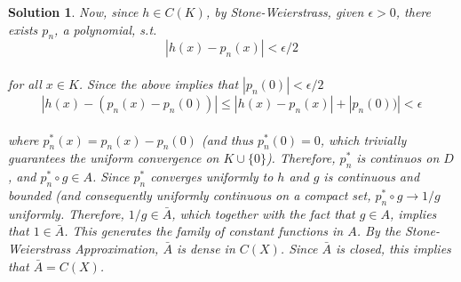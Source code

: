 \documentclass{article} %
\theoremstyle{quest}
\newtheorem*{solution}{Solution}
\begin{document}
\begin{solution}
Now, since $h\in C(K)$, by Stone-Weierstrass, given  $\epsilon >0$, there exists $p_{n}$, a polynomial, s.t.\\

$$|h(x)-p_{n}(x)|<\epsilon /2 $$\\

for all $x \in K$. Since the above implies that $|p_n(0)|< \epsilon/2$  \\
 
$$|h(x)-(p_{n}(x)-p_n(0))|\leq |h(x)-p_{n}(x)|+|p_n(0))|<\epsilon $$\\

where $p^*_n(x)=p_{n}(x)-p_n(0)$ (and thus $p^*_n(0)=0$, which trivially guarantees the uniform convergence on $K\cup\{0\}$). Therefore, $p^*_n$ is continuos on $D$, and $p^*_n \circ g \in A$. Since $p^*_n$ converges uniformly to $h$ and $g$ is continuous and bounded (and consequently uniformly continuous on a compact set, $p^*_n\circ g \rightarrow 1/g$ uniformly. Therefore, $1/g \in \bar {A}$, which together with the fact that $g \in A$, implies that $1 \in \bar {A}$. This generates the family of constant functions in $A$.  By the Stone-Weierstrass Approximation, $\bar {A}$ is dense in $C(X)$. Since $\bar{A}$ is closed, this implies that $\bar {A}=C(X)$. \\
\end{solution}
\end{document}
